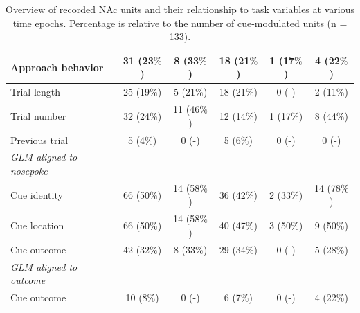 \documentclass[11pt]{article}
\begin{document}
\begin{table}[p]
\begin{tabular}{l c  c c c c}
\hline
\hspace{6mm}Approach behavior      & 31 (23$\%$)         & 8 (33$\%$)          & 18 (21$\%$)          & 1 (17$\%$)          & 4 (22$\%$)\\
\hline
\hspace{6mm}Trial length       & 25 (19$\%$)        & 5 (21$\%$)          & 18 (21$\%$)         & 0 (-)         & 2 (11$\%$)\\
\hline
\hspace{6mm}Trial number       & 32 (24$\%$)         & 11 (46$\%$)          & 12 (14$\%$)         & 1 (17$\%$)          & 8 (44$\%$)\\
\hline
\hspace{6mm}Previous trial       & 5 (4$\%$)         & 0 (-)          &5 (6$\%$)          & 0 (-)          & 0 (-)\\
\hline
\hspace{3mm}\textit{GLM aligned to nosepoke}                       &         &       &          &          &\\
\hline
\hspace{6mm}Cue identity       & 66 (50$\%$)         &14 (58$\%$)          & 36 (42$\%$)          & 2 (33$\%$)          &14 (78$\%$)\\
\hline
\hspace{6mm}Cue location       & 66 (50$\%$)         &14 (58$\%$)          & 40 (47$\%$)          & 3 (50$\%$)          & 9 (50$\%$)\\
\hline
\hspace{6mm}Cue outcome       & 42 (32$\%$)        & 8 (33$\%$)          & 29 (34$\%$)        & 0 (-)          & 5 (28$\%$)\\
\hline
\hspace{3mm}\textit{GLM aligned to outcome}                       &         &       &          &          &\\
\hline
\hspace{6mm}Cue outcome       & 10 (8$\%$)        & 0 (-)          & 6 (7$\%$)       & 0 (-)          &4 (22$\%$)\\
\hline

\end{tabular}
\caption {Overview of recorded NAc units and their relationship to
  task variables at various time epochs. Percentage is relative to the
  number of cue-modulated units (n = 133).} \label{tbl1} 
\end{table}
\end{document}
